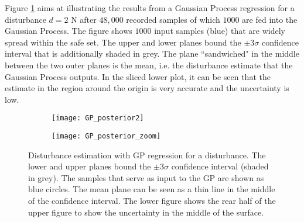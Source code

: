 \documentclass[../main.tex]{subfiles}
\begin{document}
Figure \ref{fig:GP_posterior} aims at illustrating the results from a Gaussian Process regression for a disturbance $d = 2 \text{ N}$ after $48,000$ recorded samples of which $1000$ are fed into the Gaussian Process. The figure shows $1000$ input samples (blue) that are widely spread within the safe set. The upper and lower planes bound the $\pm 3\sigma$ confidence interval that is additionally shaded in grey. The plane ``sandwiched" in the middle between the two outer planes is the mean, i.e. the disturbance estimate that the Gaussian Process outputs. In the sliced lower plot, it can be seen that the estimate in the region around the origin is very accurate and the uncertainty is low.
\begin{figure}
    \centering
    \begin{subfigure}[t]{\textwidth}
        \texttt{[image: GP\_posterior2]}
    \end{subfigure}
    
    \begin{subfigure}[t]{\textwidth}
        \texttt{[image: GP\_posterior\_zoom]}
        \end{subfigure}    \caption{Disturbance estimation with GP regression for a disturbance. The lower and upper planes bound the $\pm 3\sigma$ confidence interval (shaded in grey). The samples that serve as input to the GP are shown as blue circles. The mean plane can be seen as a thin line in the middle of the confidence interval. The lower figure shows the rear half of the upper figure to show the uncertainty in the middle of the surface.}  \label{fig:GP_posterior}
\end{figure}
\end{document}
